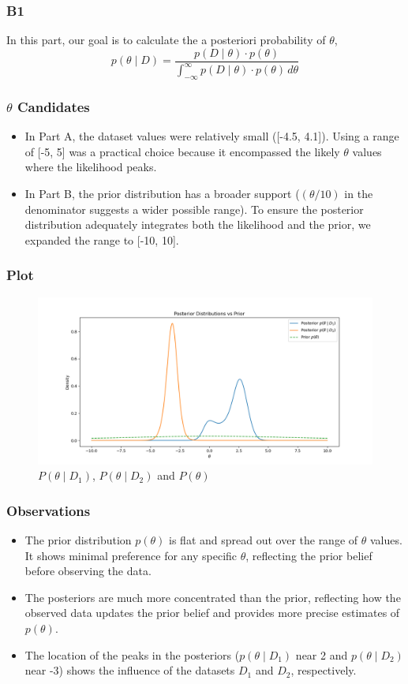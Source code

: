 \documentclass{beamer}
\begin{document}
\begin{frame}
\frametitle{B1}
In this part, our goal is to calculate the a posteriori probability of $\theta$,
$$
p(\theta \mid D) = \frac{p(D \mid \theta) \cdot p(\theta)}{\int_{-\infty}^{\infty} p(D \mid \theta) \cdot p(\theta) \, d\theta}
$$
\end{frame}

\begin{frame}
\frametitle{$\theta$ Candidates}
\begin{itemize}
    \item In Part A, the dataset values were relatively small ([-4.5, 4.1]). Using a range of [-5, 5] was a practical choice because it encompassed the likely $\theta$ values where the likelihood peaks.
    \item In Part B, the prior distribution has a broader support ($(\theta / 10)$ in the denominator suggests a wider possible range). To ensure the posterior distribution adequately integrates both the likelihood and the prior, we expanded the range to [-10, 10].
\end{itemize}

\end{frame}

\begin{frame}
\frametitle{Plot}
\begin{figure}
    \centering
    \includegraphics[width=1\linewidth]{assets/B1.png}
    \caption{$P(\theta \mid D_1)$, $P(\theta \mid D_2)$ and $P(\theta)$}
    \label{fig:enter-label}
\end{figure}
\end{frame}

\begin{frame}
\frametitle{Observations}
\begin{itemize}
    \item The prior distribution $p(\theta)$ is flat and spread out over the range of $\theta$ values. It shows minimal preference for any specific $\theta$, reflecting the prior belief before observing the data.
    \item The posteriors are much more concentrated than the prior, reflecting how the observed data updates the prior belief and provides more precise estimates of $p(\theta)$.
    \item The location of the peaks in the posteriors ($p(\theta \mid D_1)$ near 2 and $p(\theta \mid D_2)$ near -3) shows the influence of the datasets $D_1$ and $D_2$, respectively.
\end{itemize}
\end{frame}
\end{document}

